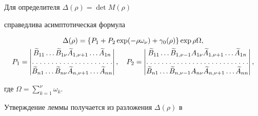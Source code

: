 \begin{lem}


Для определителя $\Delta(\rho)=\det M(\rho)$


справедлива асимптотическая формула


\begin{gather}


\Delta(\rho)=\{P_1+P_2\exp(-\rho\omega_\nu)+\gamma_0(\rho)\}


\exp\rho\Omega, \\


%


P_1=


\begin{vmatrix}


\widetilde B_{11}\dotsc\widetilde B_{1\nu}


\widetilde A_{1,\nu+1}\dotsc\widetilde A_{1n}\\


\hdotsfor[1.5]{1}\\


\widetilde B_{n1}\dotsc\widetilde B_{n\nu}\widetilde A_{n,\nu+1}\dotsc


\widetilde A_{nn}


\end{vmatrix},


\quad


P_2=


\begin{vmatrix}


\widetilde B_{11}\dotsc\widetilde B_{1,\nu-1}


A_{1\nu} \widetilde A_{1,\nu+1}\dotsc\widetilde A_{1n}\\


\hdotsfor[1.5]{1}\\


\widetilde B_{n1}\dotsc\widetilde B_{n,\nu-1} A_{n\nu} \widetilde A_{n,\nu+1}


\dotsc\widetilde A_{nn}


\end{vmatrix}, \notag


\end{gather}


где $\Omega=\sum\limits_{k=1}^{\nu}\omega_k$.


\end{lem}





Утверждение леммы получается из разложения $\Delta(\rho)$ в


